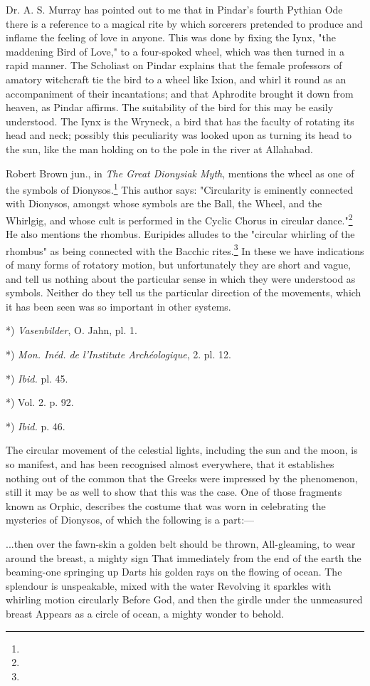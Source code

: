 \documentclass[a4paper, 11pt, oneside, polutonikogreek, english]{article}
\begin{document}
Dr. A. S. Murray has pointed out to me that in Pindar's fourth Pythian Ode there is a reference to a magical rite by which sorcerers pretended to produce and inflame the feeling of love in anyone. This was done by fixing the Iynx, "the maddening Bird of Love," to a four-spoked wheel, which was then turned in a rapid manner. The Scholiast on Pindar explains that the female professors of amatory witchcraft tie the bird to a wheel like Ixion, and whirl it round as an accompaniment of their incantations; and that Aphrodite brought it down from heaven, as Pindar affirms. The suitability of the bird for this may be easily understood. The Iynx is the Wryneck, a bird that has the faculty of rotating its head and neck; possibly this peculiarity was looked upon as turning its head to the sun, like the man holding on to the pole in the river at Allahabad.

Robert Brown jun., in \emph{The Great Dionysiak Myth}, mentions the wheel as one of the symbols of Dionysos.\footnote{} This author says: "Circularity is eminently connected with Dionysos, amongst whose symbols are the Ball, the Wheel, and the Whirlgig, and whose cult is performed in the Cyclic Chorus in circular dance."\footnote{} He also mentions the rhombus. Euripides alludes to the "circular whirling of the rhombus" as being connected with the Bacchic rites.\footnote{} In these we have indications of many forms of rotatory motion, but unfortunately they are short and vague, and tell us nothing about the particular sense in which they were understood as symbols. Neither do they tell us the particular direction of the movements, which it has been seen was so important in other systems.

*) \emph{Vasenbilder}, O. Jahn, pl. 1.

*) \emph{Mon. Inéd. de l'Institute Archéologique}, 2. pl. 12.

*) \emph{Ibid.} pl. 45.

*) Vol. 2. p. 92.

*) \emph{Ibid.} p. 46.

The circular movement of the celestial lights, including the sun and the moon, is so manifest, and has been recognised almost everywhere, that it establishes nothing out of the common that the Greeks were impressed by the phenomenon, still it may be as well to show that this was the case. One of those fragments known as Orphic, describes the costume that was worn in celebrating the mysteries of Dionysos, of which the following is a part:---

...then over the fawn-skin a golden belt should be thrown,  
All-gleaming, to wear around the breast, a mighty sign  
That immediately from the end of the earth the beaming-one springing up  
Darts his golden rays on the flowing of ocean.  
The splendour is unspeakable, mixed with the water  
Revolving it sparkles with whirling motion circularly  
Before God, and then the girdle under the unmeasured breast  
Appears as a circle of ocean, a mighty wonder to behold.
\end{document}
